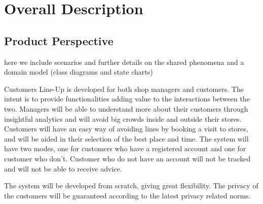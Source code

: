 \section{Overall Description}\label{sec:overall_desc}

\subsection{Product Perspective}

here we include scenarios and further details on the shared
phenomena and a domain model (class diagrams and state charts)

Customers Line-Up is developed for both shop managers and customers.
The intent is to provide functionalities adding value to the interactions between the two.
Managers will be able to understand more about their customers through insightful analytics and will avoid big crowds inside and outside their stores.
Customers will have an easy way of avoiding lines by booking a visit to stores, and will be aided in their selection of the best place and time.
The system will have two modes, one for customers who have a registered account and one for customer who don't.
Customer who do not have an account will not be tracked and will not be able to receive advice.

The system will be developed from scratch, giving great flexibility.
The privacy of the customers will be guaranteed according to the latest privacy related norms.


